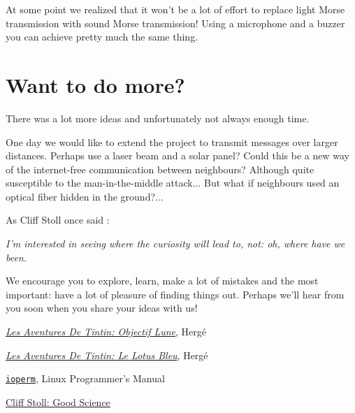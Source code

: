 \documentclass[12pt]{report}
\begin{document}
At some point we realized that it won't be a lot of effort to replace light Morse transmission with sound Morse transmission! Using a microphone and a buzzer you can achieve pretty much the same thing.

\section{Want to do more?}

There was a lot more ideas and unfortunately not always enough time.

One day we would like to extend the project to transmit messages over larger distances. Perhaps use a laser beam and a solar panel? Could this be a new way of the internet-free communication between neighbours? Although quite susceptible to the man-in-the-middle attack... But what if neighbours used an optical fiber hidden in the ground?...

As Cliff Stoll once said \cite{cliff_stoll}: 

\textit{I'm interested in seeing where the curiosity will lead to, not: oh, where have we been.}

We encourage you to explore, learn, make a lot of mistakes and the most important: have a lot of pleasure of finding things out. Perhaps we'll hear from you soon when you share your ideas with us!

\newpage

\begin{thebibliography}{50}

 \hyperlink{https://fr.wikipedia.org/wiki/Objectif_Lune}{\textit{Les Aventures De Tintin: Objectif Lune}}, Hergé

 \hyperlink{https://fr.wikipedia.org/wiki/Le_Lotus_bleu}{\textit{Les Aventures De Tintin: Le Lotus Bleu}}, Hergé

 \hyperlink{http://man7.org/linux/man-pages/man2/ioperm.2.html}{\texttt{ioperm}}, Linux Programmer's Manual

 \hyperlink{https://www.youtube.com/watch?v=xHEIOgONq6A}{Cliff Stoll: Good Science}

\end{thebibliography}
\end{document}
